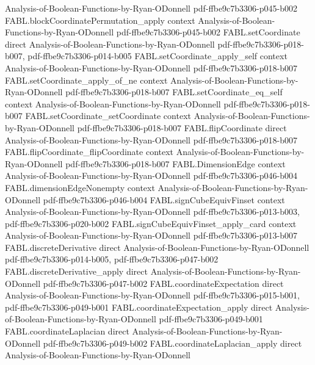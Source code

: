 \begin{theorem}
  {Analysis-of-Boolean-Functions-by-Ryan-ODonnell}
  {pdf-ffbe9c7b3306-p045-b002}
\proofstep
  {FABL.blockCoordinatePermutation_apply}
  {context}
  {Analysis-of-Boolean-Functions-by-Ryan-ODonnell}
  {pdf-ffbe9c7b3306-p045-b002}
\proofstep
  {FABL.setCoordinate}
  {direct}
  {Analysis-of-Boolean-Functions-by-Ryan-ODonnell}
  {pdf-ffbe9c7b3306-p018-b007,
    pdf-ffbe9c7b3306-p014-b005}
\proofstep
  {FABL.setCoordinate_apply_self}
  {context}
  {Analysis-of-Boolean-Functions-by-Ryan-ODonnell}
  {pdf-ffbe9c7b3306-p018-b007}
\proofstep
  {FABL.setCoordinate_apply_of_ne}
  {context}
  {Analysis-of-Boolean-Functions-by-Ryan-ODonnell}
  {pdf-ffbe9c7b3306-p018-b007}
\proofstep
  {FABL.setCoordinate_eq_self}
  {context}
  {Analysis-of-Boolean-Functions-by-Ryan-ODonnell}
  {pdf-ffbe9c7b3306-p018-b007}
\proofstep
  {FABL.setCoordinate_setCoordinate}
  {context}
  {Analysis-of-Boolean-Functions-by-Ryan-ODonnell}
  {pdf-ffbe9c7b3306-p018-b007}
\proofstep
  {FABL.flipCoordinate}
  {direct}
  {Analysis-of-Boolean-Functions-by-Ryan-ODonnell}
  {pdf-ffbe9c7b3306-p018-b007}
\proofstep
  {FABL.flipCoordinate_flipCoordinate}
  {context}
  {Analysis-of-Boolean-Functions-by-Ryan-ODonnell}
  {pdf-ffbe9c7b3306-p018-b007}
\proofstep
  {FABL.DimensionEdge}
  {context}
  {Analysis-of-Boolean-Functions-by-Ryan-ODonnell}
  {pdf-ffbe9c7b3306-p046-b004}
\proofstep
  {FABL.dimensionEdgeNonempty}
  {context}
  {Analysis-of-Boolean-Functions-by-Ryan-ODonnell}
  {pdf-ffbe9c7b3306-p046-b004}
\proofstep
  {FABL.signCubeEquivFinset}
  {context}
  {Analysis-of-Boolean-Functions-by-Ryan-ODonnell}
  {pdf-ffbe9c7b3306-p013-b003,
    pdf-ffbe9c7b3306-p020-b002}
\proofstep
  {FABL.signCubeEquivFinset_apply_card}
  {context}
  {Analysis-of-Boolean-Functions-by-Ryan-ODonnell}
  {pdf-ffbe9c7b3306-p013-b007}
\proofstep
  {FABL.discreteDerivative}
  {direct}
  {Analysis-of-Boolean-Functions-by-Ryan-ODonnell}
  {pdf-ffbe9c7b3306-p014-b005,
    pdf-ffbe9c7b3306-p047-b002}
\proofstep
  {FABL.discreteDerivative_apply}
  {direct}
  {Analysis-of-Boolean-Functions-by-Ryan-ODonnell}
  {pdf-ffbe9c7b3306-p047-b002}
\proofstep
  {FABL.coordinateExpectation}
  {direct}
  {Analysis-of-Boolean-Functions-by-Ryan-ODonnell}
  {pdf-ffbe9c7b3306-p015-b001,
    pdf-ffbe9c7b3306-p049-b001}
\proofstep
  {FABL.coordinateExpectation_apply}
  {direct}
  {Analysis-of-Boolean-Functions-by-Ryan-ODonnell}
  {pdf-ffbe9c7b3306-p049-b001}
\proofstep
  {FABL.coordinateLaplacian}
  {direct}
  {Analysis-of-Boolean-Functions-by-Ryan-ODonnell}
  {pdf-ffbe9c7b3306-p049-b002}
\proofstep
  {FABL.coordinateLaplacian_apply}
  {direct}
  {Analysis-of-Boolean-Functions-by-Ryan-ODonnell}

\end{theorem}

